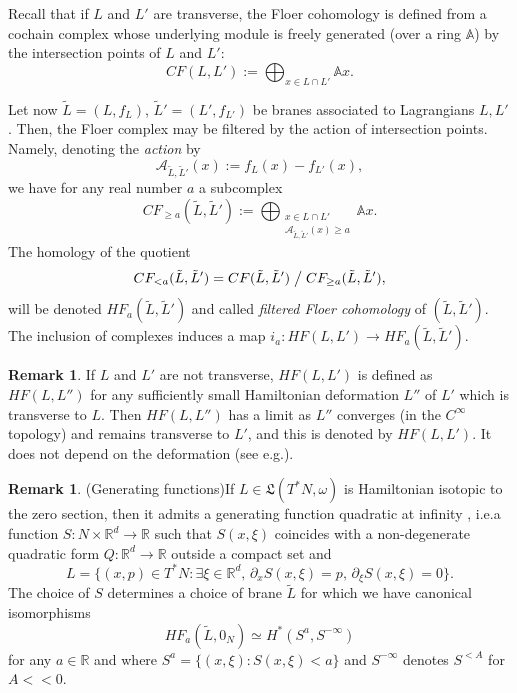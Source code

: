 \documentclass[10pt]{amsart}
\theoremstyle{definition}
\newtheorem{rem}[thm]{Remark}
\newcommand{\R}{\mathbb{R}}
\newcommand{\fL}{\mathfrak {L}}
\providecommand{\eg}{e.g.}\providecommand{\ie}{i.e.}\providecommand{\etc}{etc.}
\begin{document}
Recall that if $L$ and $L'$ are transverse, the Floer cohomology is defined from a cochain complex whose underlying module is freely generated (over a ring $\mathbb{A}$) by the intersection points of $L$ and $L'$:
\[
CF(L,L'):=\bigoplus_{x\in L\cap L'}\mathbb{A}x.
\]

Let now $\tilde L=(L,f_L)$, $\tilde L'=(L',f_{L'})$ be branes associated to Lagrangians $L, L'$. Then, the Floer complex may be filtered by the action of intersection points. Namely, denoting the \emph{action} by
\[
\mathcal A_{\tilde L,\tilde L'}(x):=f_{L}(x)-f_{L'}(x),
\]
we have for any real number $a$ a subcomplex
\[
CF_{\geq a}(\tilde L,\tilde L'):=\bigoplus_{\substack{x\in L\cap L'\\ \mathcal A_{\tilde L,\tilde L'}(x)\geq a}}\mathbb{A}x.
\]
The homology of the quotient
\[
CF_{<a}(\tilde L,\tilde L')=CF(\tilde L,\tilde L')\bigm/CF_{\geq a}(\tilde L,\tilde L'),
\]
will be denoted $HF_{a}(\tilde L,\tilde L')$ and called \emph{filtered Floer cohomology} of $(\tilde L,\tilde L')$. The inclusion of complexes induces a map $i_a:HF(L,L')\to HF_a(\tilde L,\tilde L')$.
\begin{rem}
If $L$ and $L'$ are not transverse, $HF(L,L')$ is defined as $HF(L,L'')$ for any sufficiently small Hamiltonian deformation $L''$ of $L'$ which is transverse to $L$. Then $HF(L,L'')$ has a limit as $L''$ converges (in the $C^\infty$ topology) and remains transverse to $L'$, and this is denoted by $HF(L,L')$. It does not depend on the deformation (see \eg \cite{Seidel}).
\end{rem}

\begin{rem}(Generating functions)\label{rem:generating-functions} If $L\in\fL(T^*N, \omega)$ is Hamiltonian isotopic to the zero section, then it admits a generating function quadratic at infinity \cite{Laudenbach-Sikorav}, \ie a function $S:N\times\R^d\to\R$ such that $S(x,\xi)$ coincides with a non-degenerate quadratic form $Q:\R^d\to\R$ outside a compact set and
\[
L=\bigl\{(x,p)\in T^*N: \exists \xi\in\R^d,\,\partial_xS(x,\xi)=p,\,\partial_\xi S(x,\xi)=0\bigr\}.
\]
The choice of $S$ determines a choice of brane $\tilde L$ for which we have canonical isomorphisms \cite{Viterbo-FCFH2, Milinkovic-equivalence, Milinkovic-Oh}
\[
HF_a(\tilde L,0_N)\simeq H^*(S^a,S^{-\infty})
\]
for any $a\in\R$ and where $S^{a}=\{(x,\xi):S(x,\xi)<a\}$ and $S^{-\infty}$ denotes $S^{<A}$ for $A<<0$.
\end{rem}
\end{document}
